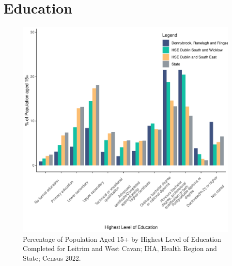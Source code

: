 \documentclass{article}
\begin{document}
\section{Education}\label{sect:Edu}
\begin{figure}[H]
	\centering
	\includegraphics[width = 120mm]{../figures/EduED.pdf}
	\caption{Percentage of Population Aged 15+ by Highest Level of Education Completed for Leitrim and West Cavan; IHA, Health Region and State; Census 2022.}
	\label{fig:vbnv}
	\end{figure}
\end{document}
